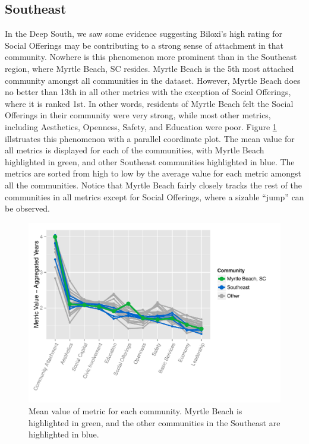 \documentclass[11pt]{article}\usepackage{knitr}
\begin{document}
\subsection{Southeast}
In the Deep South, we saw some evidence suggesting Biloxi's high rating for Social Offerings may be contributing to a strong sense of attachment in that community. Nowhere is this phenomenon more prominent than in the Southeast region, where Myrtle Beach, SC resides. Myrtle Beach is the 5th most attached community amongst all communities in the dataset. However, Myrtle Beach does no better than 13th in all other metrics with the exception of Social Offerings, where it is ranked 1st. In other words, residents of Myrtle Beach felt the Social Offerings in their community were very strong, while most other metrics, including Aesthetics, Openness, Safety, and Education were poor. Figure \ref{fig:southeast_one} illstruates this phenomenon with a parallel coordinate plot. The mean value for all metrics is displayed for each of the communities, with Myrtle Beach highlighted in green, and other Southeast communities highlighted in blue. The metrics are sorted from high to low by the average value for each metric amongst all the communities. Notice that Myrtle Beach fairly closely tracks the rest of the communities in all metrics except for Social Offerings, where a sizable ``jump'' can be observed.

\begin{knitrout}
\color{fgcolor}\begin{figure}[H]


{\centering \includegraphics[width=\maxwidth]{figure/southeast_one} 

}

\caption[Mean value of metric for each community]{Mean value of metric for each community. Myrtle Beach is highlighted in green, and the other communities in the Southeast are highlighted in blue.\label{fig:southeast_one}}
\end{figure}


\end{knitrout}
\end{document}
